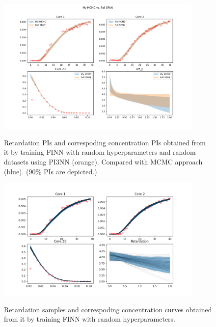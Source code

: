 \documentclass{article}
\begin{document}
\begin{figure}
    \centering
    \includegraphics[width=0.9\textwidth]{figs/finn_My MCMCvsFull SPAN_PIs.png}
    \label{fig:mcmc_vs_fullspan}
    \caption{Retardation PIs and correspoding concentration PIs obtained from it by training FINN with random hyperparameters and random datasets using PI3NN (orange). Compared with MCMC approach (blue). (90\% PIs are depicted.)}
\end{figure}


\begin{figure}
    \centering
    \includegraphics[width=0.9\textwidth]{figs/finn_span_samples.png}
    \label{fig:span_samples}
    \caption{Retardation samples and correspoding concentration curves obtained from it by training FINN with random hyperparameters.}
\end{figure}
\end{document}
